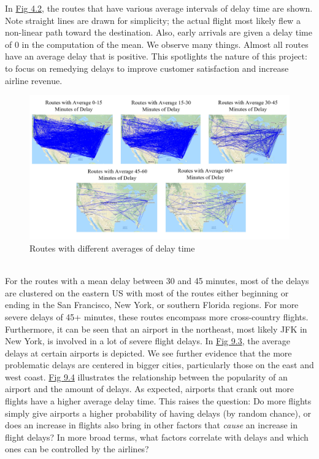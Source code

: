 \documentclass[12pt, a4paper, openany]{book}
\newcommand\tab[1][1cm]{\hspace*{#1}}
\begin{document}
			\tab In \underline{Fig 4.2}, the routes that have various average intervals of delay time are shown. Note straight lines are drawn for simplicity; the actual flight most likely flew a non-linear path toward the destination. Also, early arrivals are given a delay time of 0 in the computation of the mean. We observe many things. Almost all routes have an average delay that is positive. This spotlights the nature of this project: to focus on remedying delays to improve customer satisfaction and increase airline revenue.
			\begin{figure}[h]
			\centering
	 		\includegraphics[width = .9 \textwidth]{../figures/PLOTS FOR REPORT/Chapter 4/Figure 4.21}
	 		\caption{Routes with different averages of delay time}
	 		\end{figure}\\

	 		\tab For the routes with a mean delay between 30 and 45 minutes, most of the delays are clustered on the eastern US with most of the routes either beginning or ending in the San Francisco, New York, or southern Florida regions. For more severe delays of 45+ minutes, these routes encompass more cross-country flights. Furthermore, it can be seen that an airport in the northeast, most likely JFK in New York, is involved in a lot of severe flight delays. In \underline{Fig 9.3}, the average delays at certain airports is depicted. We see further evidence that the more problematic delays are centered in bigger cities, particularly those on the east and west coast. \underline{Fig 9.4} illustrates the relationship between the popularity of an airport and the amount of delays. As expected, airports that crank out more flights have a higher average delay time. This raises the question: Do more flights simply give airports a higher probability of having delays (by random chance), or does an increase in flights also bring in other factors that \textit{cause} an increase in flight delays? In more broad terms, what factors correlate with delays and which ones can be controlled by the airlines?\\
\end{document}
